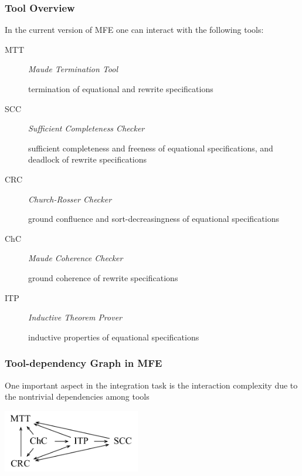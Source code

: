 \documentclass[xcolor=dvipsnames,10pt]{beamer}
\begin{document}
\begin{frame}
  \frametitle{Tool Overview}

  In the current version of MFE one can interact with the following tools:

  \begin{description}
    \item[MTT] {\em Maude Termination Tool}
      
      termination of equational and rewrite specifications

    \item[SCC] {\em Sufficient Completeness Checker}
      
      sufficient completeness and freeness of equational specifications,
      and deadlock of rewrite specifications

    \item[CRC] {\em Church-Rosser Checker}
      
      ground confluence and sort-decreasingness of equational specifications

    \item[ChC] {\em Maude Coherence Checker}
      
      ground coherence of rewrite specifications

    \item[ITP] {\em Inductive Theorem Prover}
      
      inductive properties of equational specifications

  \end{description}
\end{frame}

\begin{frame}
  \frametitle{Tool-dependency Graph in MFE}

  One important aspect in the integration task is the interaction complexity due to the
  nontrivial dependencies among tools

  \begin{center}
    \includegraphics[width=6cm]{tool-dep}
  \end{center}
\end{frame}
\end{document}
